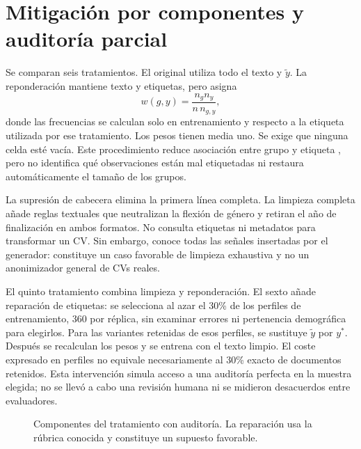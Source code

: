 \documentclass[11pt,a4paper,oneside]{report}
\begin{document}
\section{Mitigación por componentes y auditoría parcial}
Se comparan seis tratamientos. El original utiliza todo el texto y $\tilde y$. La reponderación mantiene texto y etiquetas, pero asigna
\begin{equation}
 w(g,y)=\frac{n_g n_y}{n\,n_{g,y}},
\end{equation}
donde las frecuencias se calculan solo en entrenamiento y respecto a la etiqueta utilizada por ese tratamiento. Los pesos tienen media uno. Se exige que ninguna celda esté vacía. Este procedimiento reduce asociación entre grupo y etiqueta \cite{kamiran2012}, pero no identifica qué observaciones están mal etiquetadas ni restaura automáticamente el tamaño de los grupos.

La supresión de cabecera elimina la primera línea completa. La limpieza completa añade reglas textuales que neutralizan la flexión de género y retiran el año de finalización en ambos formatos. No consulta etiquetas ni metadatos para transformar un CV. Sin embargo, conoce todas las señales insertadas por el generador: constituye un caso favorable de limpieza exhaustiva y no un anonimizador general de CVs reales.

El quinto tratamiento combina limpieza y reponderación. El sexto añade reparación de etiquetas: se selecciona al azar el 30\% de los perfiles de entrenamiento, 360 por réplica, sin examinar errores ni pertenencia demográfica para elegirlos. Para las variantes retenidas de esos perfiles, se sustituye $\tilde y$ por $y^*$. Después se recalculan los pesos y se entrena con el texto limpio. El coste expresado en perfiles no equivale necesariamente al 30\% exacto de documentos retenidos. Esta intervención simula acceso a una auditoría perfecta en la muestra elegida; no se llevó a cabo una revisión humana ni se midieron desacuerdos entre evaluadores.


\begin{figure}[htbp]\centering
{}
\caption[Componentes del tratamiento con auditoría]{Componentes del tratamiento con auditoría. La reparación usa la rúbrica conocida y constituye un supuesto favorable.}\label{fig:mitigacion}\end{figure}
\end{document}
